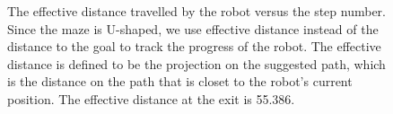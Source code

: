 \documentclass[journal]{IEEEtran}
\begin{document}
\begin{figure}[!t]
\centering
{}
{}
\vfil
{}
{}
\caption{The effective distance travelled by the robot versus the step number.
Since the maze is U-shaped, we use effective distance instead of the distance to the goal to track the progress of the robot.
The effective distance is defined to be the projection on the suggested path, which is the distance on the path that is closet to the robot's current position.
The effective distance at the exit is 55.386.
}
\label{navigation_results}
\end{figure}
\end{document}
